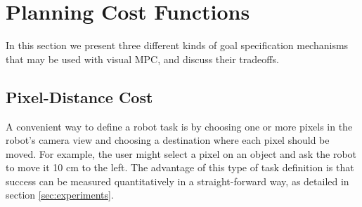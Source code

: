 \section{Planning Cost Functions}
\label{sec:cost}
In this section we present three different kinds of goal specification mechanisms that may be used with visual MPC, and discuss their tradeoffs.


\subsection{Pixel-Distance Cost}
\label{subsec:pixel_dist_cost}
A convenient way to define a robot task is by choosing one or more pixels in the robot's camera view and choosing a destination where each pixel should be moved. For example, the user might select a pixel on an object and ask the robot to move it 10 cm to the left. The advantage of this type of task definition is that success can be measured quantitatively in a straight-forward way, as detailed in section \ref{sec:experiments}.

 
